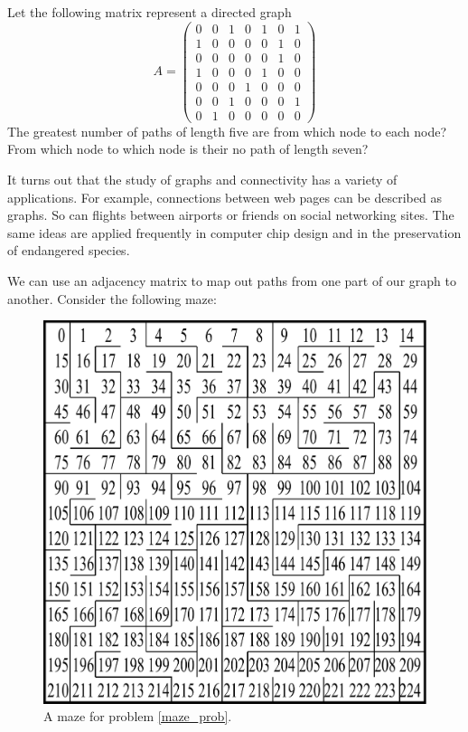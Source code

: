 \begin{problem}
Let the following matrix represent a directed graph
\[
A = \begin{pmatrix}
0 & 0 & 1 & 0 & 1 & 0 & 1\\
1 & 0 & 0 & 0 & 0 & 1 & 0\\
0 & 0 & 0 & 0 & 0 & 1 & 0\\
1 & 0 & 0 & 0 & 1 & 0 & 0\\
0 & 0 & 0 & 1 & 0 & 0 & 0\\
0 & 0 & 1  & 0 & 0& 0 & 1\\
0 & 1 & 0 & 0 & 0 & 0 & 0
\end{pmatrix}
\]
The greatest number of paths of length five are from which node to each node?
From which node to which node is their no path of length seven?
\end{problem}

It turns out that the study of graphs and connectivity has a variety of applications.
For example, connections between web pages can be described as graphs.
So can flights between airports or friends on social networking sites.
The same ideas are applied frequently in computer chip design and in the preservation of endangered species.

We can use an adjacency matrix to map out paths from one part of our graph to another.
Consider the following maze:

\begin{figure}
\includegraphics[width=.8\textwidth]{maze.pdf}
\caption{A maze for problem \ref{maze_prob}.}
\label{maze_fig}
\end{figure}

